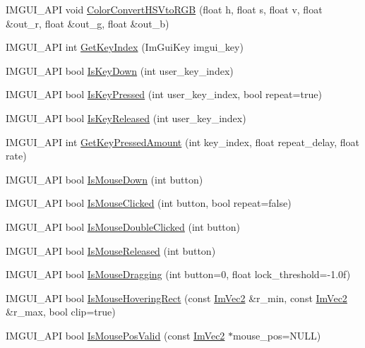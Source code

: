 \begin{DoxyCompactItemize}
I\+M\+G\+U\+I\+\_\+\+A\+PI void \hyperlink{namespace_im_gui_a074427678b3e56378b7dcdefa4c8b5c7}{Color\+Convert\+H\+S\+Vto\+R\+GB} (float h, float s, float v, float \&out\+\_\+r, float \&out\+\_\+g, float \&out\+\_\+b)
\item 
I\+M\+G\+U\+I\+\_\+\+A\+PI int \hyperlink{namespace_im_gui_a6cf235f0d0787d51a93f6d90e0bdff9b}{Get\+Key\+Index} (Im\+Gui\+Key imgui\+\_\+key)
\item 
I\+M\+G\+U\+I\+\_\+\+A\+PI bool \hyperlink{namespace_im_gui_a633d848504c89e7756ddd33474bc78d2}{Is\+Key\+Down} (int user\+\_\+key\+\_\+index)
\item 
I\+M\+G\+U\+I\+\_\+\+A\+PI bool \hyperlink{namespace_im_gui_a83331a8afa5316bc98ed9c98b151ac01}{Is\+Key\+Pressed} (int user\+\_\+key\+\_\+index, bool repeat=true)
\item 
I\+M\+G\+U\+I\+\_\+\+A\+PI bool \hyperlink{namespace_im_gui_a3fb25247181c5c292fe4f932bd20de88}{Is\+Key\+Released} (int user\+\_\+key\+\_\+index)
\item 
I\+M\+G\+U\+I\+\_\+\+A\+PI int \hyperlink{namespace_im_gui_ad94a09fc01052f02fe11bec5a3c11275}{Get\+Key\+Pressed\+Amount} (int key\+\_\+index, float repeat\+\_\+delay, float rate)
\item 
I\+M\+G\+U\+I\+\_\+\+A\+PI bool \hyperlink{namespace_im_gui_a8ddf4d05de8ab8b9aa70906a22a9973e}{Is\+Mouse\+Down} (int button)
\item 
I\+M\+G\+U\+I\+\_\+\+A\+PI bool \hyperlink{namespace_im_gui_a22b689cf4cf519590c2e2ad4f5462f29}{Is\+Mouse\+Clicked} (int button, bool repeat=false)
\item 
I\+M\+G\+U\+I\+\_\+\+A\+PI bool \hyperlink{namespace_im_gui_a0d39701e7a0d7629e1b96b68e935542e}{Is\+Mouse\+Double\+Clicked} (int button)
\item 
I\+M\+G\+U\+I\+\_\+\+A\+PI bool \hyperlink{namespace_im_gui_aef586112e8d1eb26ce28198d9efe9bba}{Is\+Mouse\+Released} (int button)
\item 
I\+M\+G\+U\+I\+\_\+\+A\+PI bool \hyperlink{namespace_im_gui_a7905828a024c6c005fa1887e62235ca4}{Is\+Mouse\+Dragging} (int button=0, float lock\+\_\+threshold=-\/1.\+0f)
\item 
I\+M\+G\+U\+I\+\_\+\+A\+PI bool \hyperlink{namespace_im_gui_ae0b8ea0e06c457316d6aed6c5b2a1c25}{Is\+Mouse\+Hovering\+Rect} (const \hyperlink{struct_im_vec2}{Im\+Vec2} \&r\+\_\+min, const \hyperlink{struct_im_vec2}{Im\+Vec2} \&r\+\_\+max, bool clip=true)
\item 
I\+M\+G\+U\+I\+\_\+\+A\+PI bool \hyperlink{namespace_im_gui_a22d482190e8f549d5904aded1c6f7778}{Is\+Mouse\+Pos\+Valid} (const \hyperlink{struct_im_vec2}{Im\+Vec2} $\ast$mouse\+\_\+pos=N\+U\+LL)

\end{DoxyCompactItemize}
